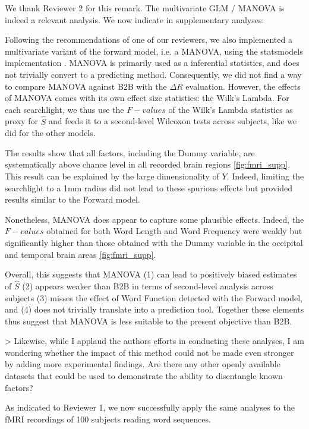 We thank Reviewer 2 for this remark. The multivariate GLM / MANOVA is indeed
a relevant analysis. We now indicate in supplementary analyses:

Following the recommendations of one of our reviewers, we also implemented a
multivariate variant of the forward model, i.e. a MANOVA, using the statsmodels
implementation \citep{seabold2010statsmodels}. MANOVA is primarily used as a
inferential statistics, and does not trivially convert to a predicting method.
Consequently, we did not find a way to compare MANOVA against B2B with the
$\Delta R$ evaluation. However, the effects of MANOVA comes with its own effect
size statistics: the Wilk's Lambda. For each searchlight, we thus use the $F-values$ of the
Wilk's Lambda statistics as proxy for $\hat S$ and feeds it to a second-level
Wilcoxon tests across subjects, like we did for the other models.

The results show that all factors, including the Dummy variable, are
systematically above chance level in all recorded brain regions \ref{fig:fmri_supp}. This result
can be explained by the large dimensionality of $Y$. Indeed, limiting the
searchlight to a 1mm radius did not lead to these spurious effects but provided
results similar to the Forward model.

Nonetheless, MANOVA does appear to capture some plausible effects. Indeed, the
$F-values$ obtained for both Word Length and Word Frequency were weakly but
significantly higher than those obtained with the Dummy variable in the
occipital and temporal brain areas \ref{fig:fmri_supp}.

Overall, this suggests that MANOVA (1) can lead to positively biased estimates of
$\hat S$ (2) appears weaker than B2B in terms of second-level analysis across
subjects (3) misses the effect of Word Function detected with the Forward model,
and (4) does not trivially translate into a prediction tool. Together these
elements thus suggest that MANOVA is less suitable to the present objective than
B2B.


> Likewise, while I applaud the authors efforts in conducting these analyses,
    I am wondering whether the impact of this method could not be made even
    stronger by adding more experimental findings. Are there any other openly
    available datasets that could be used to demonstrate the ability to
    disentangle known factors?

As indicated to Reviewer 1, we now successfully apply the same analyses to the fMRI
recordings of 100 subjects reading word sequences.

